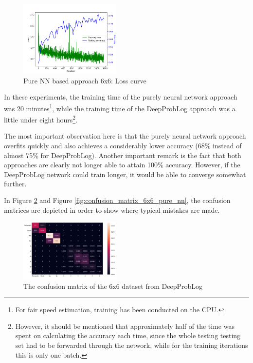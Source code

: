 \documentclass[english]{sobraep}
\begin{document}
\begin{figure}[htp]
    \begin{center}
    \includegraphics[width=0.45\textwidth]{loss_curve_pure_NN_6x6.png} 
    \captionsetup{justification=centering}
    \caption{Pure NN based approach 6x6: Loss curve}
    \label{fig:loss_curve_pure_NN_6x6}
    \end{center}
\end{figure}

In these experiments, the training time of the purely neural network approach was 20 minutes\footnote{For fair speed estimation, training has been conducted on the CPU.}, while the training time of the DeepProbLog approach was a little under eight hours\footnote{However, it should be mentioned that approximately half of the time was spent on calculating the accuracy each time, since the whole testing testing set had to be forwarded through the network, while for the training iterations this is only one batch.}.

The most important observation here is that the purely neural network approach overfits quickly and also achieves a considerably lower accuracy (68\% instead of almost 75\% for DeepProbLog). Another important remark is the fact that both approaches are clearly not longer able to attain 100\% accuracy. However, if the DeepProbLog network could train longer, it would be able to converge somewhat further.

In Figure \ref{fig:confusion_matrix_6x6_deepproblog} and Figure \ref{fig:confusion_matrix_6x6_pure_nn}, the confusion matrices are depicted in order to show where typical mistakes are made.

\begin{figure}[htp]
    \begin{center}
    \includegraphics[width=0.45\textwidth]{confusion_matrix_6x6_deepproblog.png} 
    \captionsetup{justification=centering}
    \caption{The confusion matrix of the 6x6 dataset from DeepProbLog}
    \label{fig:confusion_matrix_6x6_deepproblog}
    \end{center}
\end{figure}
\end{document}
